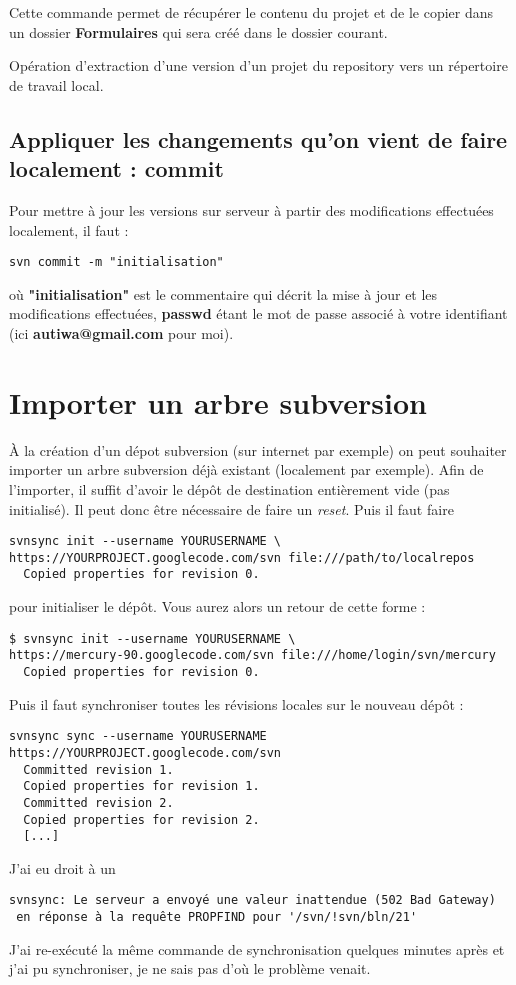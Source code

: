 \documentclass[a4paper,twoside]{article}
\begin{document}
Cette commande permet de récupérer le contenu du projet et de le copier dans un dossier \textbf{Formulaires} qui sera créé dans le dossier courant.

\begin{definition}[Checkout]
Opération d'extraction d'une version d'un projet du repository vers un répertoire de travail local.
\end{definition}


\subsection{Appliquer les changements qu'on vient de faire localement : commit}

Pour mettre à jour les versions sur serveur à partir des modifications effectuées localement, il faut : 
\begin{verbatim}
svn commit -m "initialisation"
\end{verbatim}
où \textbf{"initialisation"} est le commentaire qui décrit la mise à jour et les modifications effectuées, \textbf{passwd} étant le mot de passe associé à votre identifiant (ici \textbf{autiwa@gmail.com} pour moi).


\section{Importer un arbre subversion}
À la création d'un dépot subversion (sur internet par exemple) on peut souhaiter importer un arbre subversion déjà existant (localement par exemple). Afin de l'importer, il suffit d'avoir le dépôt de destination entièrement vide (pas initialisé). Il peut donc être nécessaire de faire un \emph{reset}. Puis il faut faire 
\begin{verbatim}
svnsync init --username YOURUSERNAME \
https://YOURPROJECT.googlecode.com/svn file:///path/to/localrepos
  Copied properties for revision 0.
\end{verbatim}
pour initialiser le dépôt. Vous aurez alors un retour de cette forme : 
\begin{verbatim}
$ svnsync init --username YOURUSERNAME \
https://mercury-90.googlecode.com/svn file:///home/login/svn/mercury
  Copied properties for revision 0.
\end{verbatim}

Puis il faut synchroniser toutes les révisions locales sur le nouveau dépôt : 
\begin{verbatim}
svnsync sync --username YOURUSERNAME https://YOURPROJECT.googlecode.com/svn
  Committed revision 1.
  Copied properties for revision 1.
  Committed revision 2.
  Copied properties for revision 2.
  [...]
\end{verbatim}

\begin{remarque}
J'ai eu droit à un 
\begin{verbatim}
svnsync: Le serveur a envoyé une valeur inattendue (502 Bad Gateway)
 en réponse à la requête PROPFIND pour '/svn/!svn/bln/21'
\end{verbatim}
J'ai re-exécuté la même commande de synchronisation quelques minutes après et j'ai pu synchroniser, je ne sais pas d'où le problème venait.
\end{remarque}
\end{document}
